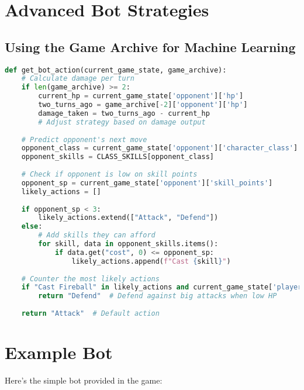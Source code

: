 \documentclass[12pt]{article}
\begin{document}
\section{Advanced Bot Strategies}
\label{sec:advanced}

\subsection{Using the Game Archive for Machine Learning}
\begin{lstlisting}[language=Python, caption=Advanced Archive Analysis]
def get_bot_action(current_game_state, game_archive):
    # Calculate damage per turn
    if len(game_archive) >= 2:
        current_hp = current_game_state['opponent']['hp']
        two_turns_ago = game_archive[-2]['opponent']['hp']
        damage_taken = two_turns_ago - current_hp
        # Adjust strategy based on damage output
    
    # Predict opponent's next move
    opponent_class = current_game_state['opponent']['character_class']
    opponent_skills = CLASS_SKILLS[opponent_class]
    
    # Check if opponent is low on skill points
    opponent_sp = current_game_state['opponent']['skill_points']
    likely_actions = []
    
    if opponent_sp < 3:
        likely_actions.extend(["Attack", "Defend"])
    else:
        # Add skills they can afford
        for skill, data in opponent_skills.items():
            if data.get("cost", 0) <= opponent_sp:
                likely_actions.append(f"Cast {skill}")
    
    # Counter the most likely actions
    if "Cast Fireball" in likely_actions and current_game_state['player']['hp'] < 50:
        return "Defend"  # Defend against big attacks when low HP
    
    return "Attack"  # Default action
\end{lstlisting}

\section{Example Bot}
\label{sec:example}

Here's the simple bot provided in the game:
\end{document}
